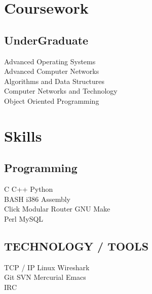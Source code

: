 \documentclass[letterpaper]{deedy-resume} %
\begin{document}
\begin{minipage}[t]{0.33\textwidth}
\section{Coursework}
\subsection{UnderGraduate}
Advanced Operating Systems \\
Advanced Computer Networks \\
Algorithms and Data Structures \\
Computer Networks and Technology \\
Object Oriented Programming \\
\sectionspace %
\section{Skills}
\subsection{Programming}
C \textbullet{} C++ \textbullet{} Python \\
BASH \textbullet{} i386 Assembly \\
Click Modular Router  \textbullet{} GNU Make \\
Perl \textbullet{} MySQL
\sectionspace %
\subsection{TECHNOLOGY / TOOLS}
TCP / IP \textbullet{} Linux \textbullet{} Wireshark \\
Git \textbullet{} SVN \textbullet{} Mercurial \textbullet{}  Emacs \\
IRC

\end{minipage} %
\hfill
%
%
\end{document}
